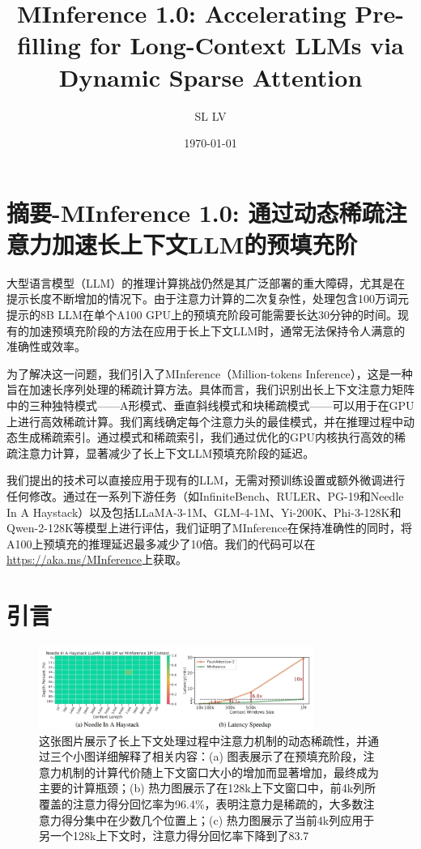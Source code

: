\documentclass[twocolumn, 10pt]{article} %
\theoremstyle{remark}
\begin{document}
\title{MInference 1.0: Accelerating Pre-filling for Long-Context LLMs via Dynamic Sparse Attention}
\author{SL LV}
\date{\today}
\maketitle

\section{摘要-MInference 1.0: 通过动态稀疏注意力加速长上下文LLM的预填充阶}

大型语言模型（LLM）的推理计算挑战仍然是其广泛部署的重大障碍，尤其是在提示长度不断增加的情况下。由于注意力计算的二次复杂性，处理包含100万词元提示的8B LLM在单个A100 GPU上的预填充阶段可能需要长达30分钟的时间。现有的加速预填充阶段的方法在应用于长上下文LLM时，通常无法保持令人满意的准确性或效率。

为了解决这一问题，我们引入了MInference（Million-tokens Inference），这是一种旨在加速长序列处理的稀疏计算方法。具体而言，我们识别出长上下文注意力矩阵中的三种独特模式——A形模式、垂直斜线模式和块稀疏模式——可以用于在GPU上进行高效稀疏计算。我们离线确定每个注意力头的最佳模式，并在推理过程中动态生成稀疏索引。通过模式和稀疏索引，我们通过优化的GPU内核执行高效的稀疏注意力计算，显著减少了长上下文LLM预填充阶段的延迟。

我们提出的技术可以直接应用于现有的LLM，无需对预训练设置或额外微调进行任何修改。通过在一系列下游任务（如InfiniteBench、RULER、PG-19和Needle In A Haystack）以及包括LLaMA-3-1M、GLM-4-1M、Yi-200K、Phi-3-128K和Qwen-2-128K等模型上进行评估，我们证明了MInference在保持准确性的同时，将A100上预填充的推理延迟最多减少了10倍。我们的代码可以在\href{https://aka.ms/MInference}{https://aka.ms/MInference}上获取。



\section{引言}

\begin{figure}[ht]
    \centering
    \includegraphics[width=0.8\textwidth]{m_attention_weights.png}
    \caption{
        这张图片展示了长上下文处理过程中注意力机制的动态稀疏性，并通过三个小图详细解释了相关内容：(a) 图表展示了在预填充阶段，注意力机制的计算代价随上下文窗口大小的增加而显著增加，最终成为主要的计算瓶颈；(b) 热力图展示了在128k上下文窗口中，前4k列所覆盖的注意力得分回忆率为96.4\%，表明注意力是稀疏的，大多数注意力得分集中在少数几个位置上；(c) 热力图展示了当前4k列应用于另一个128k上下文时，注意力得分回忆率下降到了83.7%
    }
\end{figure}
\end{document}
